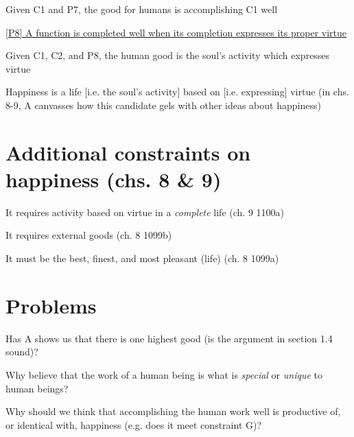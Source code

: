 \documentclass[11pt]{article}
\begin{document}
\noindent [C2] Given C1 and P7, the good for humans is accomplishing C1 well
\vspace*{3mm}

\noindent \underline{[P8] A function is completed well when its completion expresses its proper virtue}
\vspace*{1mm}

\noindent [C3] Given C1, C2, and P8, the human good is the soul's activity which expresses virtue
\vspace*{2mm}

\noindent Happiness is a life [i.e. the soul's activity] based on [i.e. expressing] virtue (in chs. 8-9, A canvasses how this candidate gels with other ideas about happiness)
\vspace*{-3mm}

\section*{Additional constraints on happiness (chs. 8 \& 9)}

\noindent [E] It requires activity based on virtue in a \emph{complete} life (ch. 9 1100a)
\vspace*{2mm}

\noindent [F] It requires external goods (ch. 8 1099b)
\vspace*{2mm}

\noindent [G] It must be the best, finest, and most pleasant (life) (ch. 8 1099a)
\vspace*{-3mm}

\section*{Problems}

\noindent [1] Has A shows us that there is one highest good (is the argument in section 1.4 sound)?
\vspace*{2mm}

\noindent [2] Why believe that the work of a human being is what is \emph{special} or \emph{unique} to human beings?
\vspace*{2mm}

\noindent [3] Why should we think that accomplishing the human work well is productive of, or identical with, happiness (e.g. does it meet constraint G)?
\end{document}
